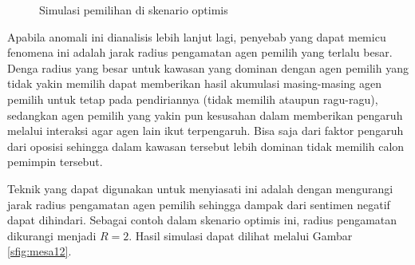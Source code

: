 \begin{figure}[H]
	\centering
	\hfill
	\hfill
	\caption{Simulasi pemilihan di skenario optimis}
	\label{fig:simulasi_mesa_optimis}
\end{figure}

Apabila anomali ini dianalisis lebih lanjut lagi, penyebab yang dapat memicu fenomena ini adalah jarak radius pengamatan agen pemilih yang terlalu besar. Denga radius yang besar untuk kawasan yang dominan dengan agen pemilih yang tidak yakin memilih dapat memberikan hasil akumulasi masing-masing agen pemilih untuk tetap pada pendiriannya (tidak memilih ataupun ragu-ragu), sedangkan agen pemilih yang yakin pun kesusahan dalam memberikan pengaruh melalui interaksi agar agen lain ikut terpengaruh. Bisa saja dari faktor pengaruh dari oposisi sehingga dalam kawasan tersebut lebih dominan tidak memilih calon pemimpin tersebut.

Teknik yang dapat digunakan untuk menyiasati ini adalah dengan mengurangi jarak radius pengamatan agen pemilih sehingga dampak dari sentimen negatif dapat dihindari. Sebagai contoh dalam skenario optimis ini, radius pengamatan dikurangi menjadi $R=2$. Hasil simulasi dapat dilihat melalui Gambar \ref{sfig:mesa12}.

